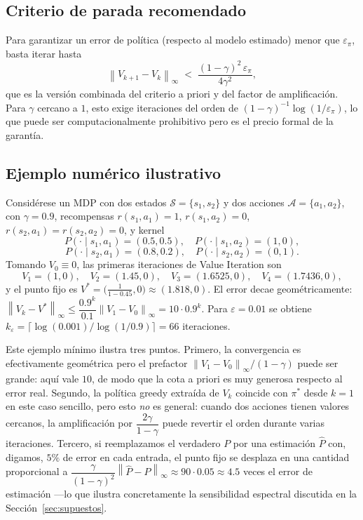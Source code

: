 \documentclass[12pt, a4paper]{article}
\theoremstyle{plain}
\theoremstyle{definition}
\newcommand{\cS}{\mathcal{S}}
\newcommand{\cA}{\mathcal{A}}
\newcommand{\Vopt}{V^{*}}
\newcommand{\norminf}[1]{\left\|#1\right\|_{\infty}}
\newcommand{\Phat}{\widehat{P}}
\begin{document}
\subsection{Criterio de parada recomendado}

Para garantizar un error de política (respecto al modelo estimado) menor
que $\varepsilon_{\pi}$, basta iterar hasta
\[
  \norminf{V_{k+1}-V_k}
  \;<\;\frac{(1-\gamma)^2\,\varepsilon_{\pi}}{4\gamma^2},
\]
que es la versión combinada del criterio a priori y del factor de
amplificación. Para $\gamma$ cercano a $1$, esto exige iteraciones del
orden de $(1-\gamma)^{-1}\log(1/\varepsilon_{\pi})$, lo que puede ser
computacionalmente prohibitivo pero es el precio formal de la garantía.

\subsection{Ejemplo numérico ilustrativo}

Considérese un MDP con dos estados $\cS=\{s_1,s_2\}$ y dos acciones
$\cA=\{a_1,a_2\}$, con $\gamma=0.9$, recompensas
$r(s_1,a_1)=1$, $r(s_1,a_2)=0$, $r(s_2,a_1)=r(s_2,a_2)=0$, y kernel
\[
  P(\cdot\mid s_1,a_1)=(0.5,0.5),\quad
  P(\cdot\mid s_1,a_2)=(1,0),
\]
\[
  P(\cdot\mid s_2,a_1)=(0.8,0.2),\quad
  P(\cdot\mid s_2,a_2)=(0,1).
\]
Tomando $V_0\equiv 0$, las primeras iteraciones de Value Iteration son
\[
  V_1=(1,0),\quad
  V_2=(1.45,0),\quad
  V_3=(1.6525,0),\quad
  V_4=(1.7436,0),
\]
y el punto fijo es $\Vopt=\bigl(\tfrac{1}{1-0.45},0\bigr)\approx(1.818,0)$.
El error decae geométricamente:
$\norminf{V_k-\Vopt}\leq\dfrac{0.9^k}{0.1}\norminf{V_1-V_0}=10\cdot 0.9^k$.
Para $\varepsilon=0.01$ se obtiene
$k_\varepsilon=\lceil\log(0.001)/\log(1/0.9)\rceil=66$ iteraciones.

Este ejemplo mínimo ilustra tres puntos. Primero, la convergencia es
efectivamente geométrica pero el prefactor $\norminf{V_1-V_0}/(1-\gamma)$
puede ser grande: aquí vale $10$, de modo que la cota a priori es muy
generosa respecto al error real. Segundo, la política greedy extraída de
$V_k$ coincide con $\pi^{*}$ desde $k=1$ en este caso sencillo, pero esto
\emph{no} es general: cuando dos acciones tienen valores cercanos, la
amplificación por $\dfrac{2\gamma}{1-\gamma}$ puede revertir el orden
durante varias iteraciones. Tercero, si reemplazamos el verdadero $P$ por
una estimación $\Phat$ con, digamos, $5\%$ de error en cada entrada, el
punto fijo se desplaza en una cantidad proporcional a
$\dfrac{\gamma}{(1-\gamma)^2}\norminf{\Phat-P}\approx 90\cdot 0.05\approx 4.5$
veces el error de estimación ---lo que ilustra concretamente la
sensibilidad espectral discutida en la Sección~\ref{sec:supuestos}.
\end{document}
